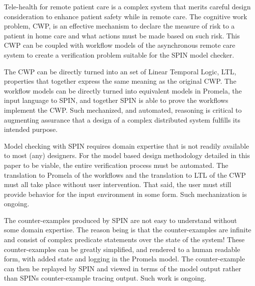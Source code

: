 Tele-health for remote patient care is a complex system that merits careful design consideration to enhance patient safety while in remote care. The cognitive work problem, CWP, is an effective mechanism to declare the measure of risk to a patient in home care and what actions must be made based on such risk. This CWP can be coupled with workflow models of the asynchronous remote care system to create a verification problem suitable for the SPIN model checker.

The CWP can be directly turned into an set of Linear Temporal Logic, LTL, properties that together express the same meaning as the original CWP. The workflow models can be directly turned into equivalent models in Promela, the input language to SPIN, and together SPIN is able to prove the workflows implement the CWP. Such mechanized, and automated, reasoning is critical to augmenting assurance that a design of a complex distributed system fulfills its intended purpose. 

Model checking with SPIN requires domain expertise that is not readily available to most (any) designers. For the model based design methodology detailed in this paper to be viable, the entire verification process must be automated. The translation to Promela of the workflows and the translation to LTL of the CWP must all take place without user intervention. That said, the user must still provide behavior for the input environment in some form. Such mechanization is ongoing.

The counter-examples produced by SPIN are not easy to understand without some domain expertise. The reason being is that the counter-examples are infinite and consist of complex predicate statements over the state of the system! These counter-examples can be greatly simplified, and rendered to a human readable form, with added state and logging in the Promela model. The counter-example can then be replayed by SPIN and viewed in terms of the model output rather than SPINs counter-example tracing output. Such work is ongoing.